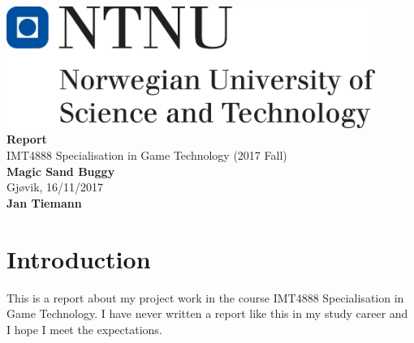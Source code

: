 \documentclass[12pt,a4paper,twoside,titlepage,headsepline,numbers=noenddot,listof=totoc,index=totoc,bibliography=totoc]{scrartcl}
\theoremstyle{break}
\begin{document}
                


\setcounter{page}{1}

\begin{titlepage}
\thispagestyle{empty}
\begin{center}

		\includegraphics[width=12cm]{figures/uni-logo}\\
                     
  \vspace{4cm}
		{\LARGE  \textbf{Report}} \\ 
		\vspace{0.5cm}
		{\Large IMT4888 Specialisation in Game Technology (2017 Fall) } \\ 
		\vspace{1.5cm}
		{\Large\textbf{Magic Sand Buggy}} \\
		\vspace{0.5cm}
		Gjøvik, 16/11/2017 \\
		\vspace{2cm}
		\textbf{Jan Tiemann} 			
\end{center}
\end{titlepage}

\clearpage
	



\setcounter{page}{1}


\section{Introduction}
This is a report about my project work in the course IMT4888 Specialisation in Game Technology. I have never written a report like this in my study career and I hope I meet the expectations. 
\end{document}
